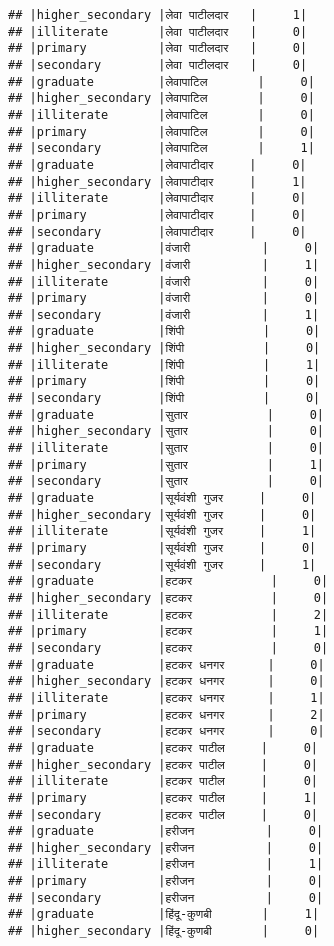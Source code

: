 \documentclass[
]{article}
\begin{document}
\begin{verbatim}
## |higher_secondary |लेवा पाटीलदार   |     1|
## |illiterate       |लेवा पाटीलदार   |     0|
## |primary          |लेवा पाटीलदार   |     0|
## |secondary        |लेवा पाटीलदार   |     0|
## |graduate         |लेवापाटिल       |     0|
## |higher_secondary |लेवापाटिल       |     0|
## |illiterate       |लेवापाटिल       |     0|
## |primary          |लेवापाटिल       |     0|
## |secondary        |लेवापाटिल       |     1|
## |graduate         |लेवापाटीदार     |     0|
## |higher_secondary |लेवापाटीदार     |     1|
## |illiterate       |लेवापाटीदार     |     0|
## |primary          |लेवापाटीदार     |     0|
## |secondary        |लेवापाटीदार     |     0|
## |graduate         |वंजारी          |     0|
## |higher_secondary |वंजारी          |     1|
## |illiterate       |वंजारी          |     0|
## |primary          |वंजारी          |     0|
## |secondary        |वंजारी          |     1|
## |graduate         |शिंपी           |     0|
## |higher_secondary |शिंपी           |     0|
## |illiterate       |शिंपी           |     1|
## |primary          |शिंपी           |     0|
## |secondary        |शिंपी           |     0|
## |graduate         |सुतार           |     0|
## |higher_secondary |सुतार           |     0|
## |illiterate       |सुतार           |     0|
## |primary          |सुतार           |     1|
## |secondary        |सुतार           |     0|
## |graduate         |सूर्यवंशी गुजर     |     0|
## |higher_secondary |सूर्यवंशी गुजर     |     0|
## |illiterate       |सूर्यवंशी गुजर     |     1|
## |primary          |सूर्यवंशी गुजर     |     0|
## |secondary        |सूर्यवंशी गुजर     |     1|
## |graduate         |हटकर           |     0|
## |higher_secondary |हटकर           |     0|
## |illiterate       |हटकर           |     2|
## |primary          |हटकर           |     1|
## |secondary        |हटकर           |     0|
## |graduate         |हटकर धनगर      |     0|
## |higher_secondary |हटकर धनगर      |     0|
## |illiterate       |हटकर धनगर      |     1|
## |primary          |हटकर धनगर      |     2|
## |secondary        |हटकर धनगर      |     0|
## |graduate         |हटकर पाटील     |     0|
## |higher_secondary |हटकर पाटील     |     0|
## |illiterate       |हटकर पाटील     |     0|
## |primary          |हटकर पाटील     |     1|
## |secondary        |हटकर पाटील     |     0|
## |graduate         |हरीजन          |     0|
## |higher_secondary |हरीजन          |     0|
## |illiterate       |हरीजन          |     1|
## |primary          |हरीजन          |     0|
## |secondary        |हरीजन          |     0|
## |graduate         |हिंदू-कुणबी       |     1|
## |higher_secondary |हिंदू-कुणबी       |     0|

\end{verbatim}
\end{document}
